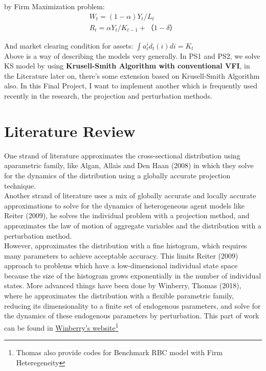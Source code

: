 by Firm Maximization problem: 
\begin{align}
W_t = (1-\alpha)Y_t/L_{t} \\
R_t = \alpha Y_t/K_{t-1} + （1- \delta）
\end{align} 


And market clearing condition for assets: $\int a^i_t d_t (i)di = K_t$\\

Above is a way of describing the models very generally. In {\color{red} PS1 and PS2}, we solve KS model by using \textbf{Krusell-Smith Algorithm with conventional VFI}, in the Literature later on, there's some extension based on Krusell-Smith Algorithm also. In this Final Project, I want to implement another which is frequently used recently in the research, the projection and perturbation methods.\\

\section{Literature Review}\label{secLiter}

One strand of literature approximates the cross-sectional distribution using aparametric family, like Algan, Allais and Den Haan (2008)\cite{algan2008solving} in which they solve for the dynamics of the distribution using a globally accurate projection technique.\\

Another strand of literature uses a mix of globally accurate and locally accurate approximations to solve for the dynamics of heterogeneous agent models like Reiter (2009)\cite{reiter2009solving}, he solves the individual problem with a projection method, and approximates the law of motion of aggregate variables and the distribution with a perturbation method.\\

However, approximates the distribution with a fine histogram, which requires many parameters to achieve acceptable accuracy. This limits Reiter (2009)\cite{reiter2009solving} approach to problems which have a low-dimensional individual state space because the size of the histogram grows exponentially in the number of individual states. More advanced things have been done by Winberry, Thomas (2018)\cite{winberry2018method}, where he approximates the distribution with a flexible parametric family, reducing its dimensionality to a finite set of endogenous parameters, and solve for the dynamics of these endogenous parameters by perturbation. This part of work can be found in  \href{http://faculty.chicagobooth.edu/thomas.winberry/research/index.html}{Winberry's website}\footnote{Thomas also provide codes for Benchmark RBC model with Firm Heteregeneity}

